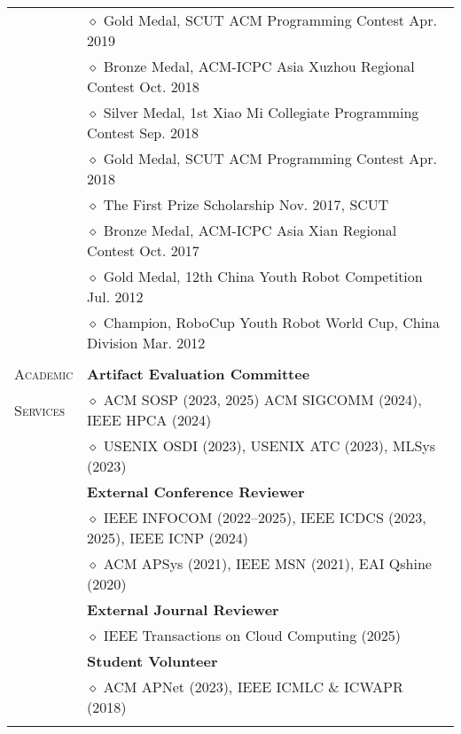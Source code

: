 \documentclass[letterpaper, 12pt]{article}
\begin{document}
\begin{longtable}{p{1.0in}p{5.8in}}
& $\diamond$ Gold Medal, SCUT ACM Programming Contest \hfill Apr. 2019 \\

& $\diamond$ Bronze Medal, ACM-ICPC Asia Xuzhou Regional Contest \hfill Oct. 2018 \\

& $\diamond$ Silver Medal, 1st Xiao Mi Collegiate Programming Contest \hfill Sep. 2018 \\

& $\diamond$ Gold Medal, SCUT ACM Programming Contest \hfill Apr. 2018 \\

& $\diamond$ The First Prize Scholarship \hfill Nov. 2017, SCUT \\

& $\diamond$ Bronze Medal, ACM-ICPC Asia Xian Regional Contest \hfill Oct. 2017 \\

& $\diamond$ Gold Medal, 12th China Youth Robot Competition \hfill Jul. 2012 \\

& $\diamond$ Champion, RoboCup Youth Robot World Cup, China Division \hfill Mar. 2012 \\

& \\

{\textsc{Academic}}
& \textbf{Artifact Evaluation Committee} \\
{\textsc{Services}}
& $\diamond$ ACM SOSP (2023, 2025) ACM SIGCOMM (2024), IEEE HPCA (2024) \\
& $\diamond$ USENIX OSDI (2023), USENIX ATC (2023), MLSys (2023) \\
& \textbf{External Conference Reviewer} \\
& $\diamond$ IEEE INFOCOM (2022--2025), IEEE ICDCS (2023, 2025), IEEE ICNP (2024) \\
& $\diamond$ ACM APSys (2021), IEEE MSN (2021), EAI Qshine (2020) \\
& \textbf{External Journal Reviewer} \\
& $\diamond$ IEEE Transactions on Cloud Computing (2025) \\
& \textbf{Student Volunteer} \\
& $\diamond$ ACM APNet (2023), IEEE ICMLC \& ICWAPR (2018) \\
& \\


\end{longtable}
\end{document}

